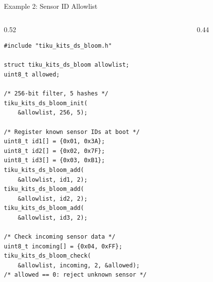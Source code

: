 \documentclass[aspectratio=169, 10pt]{beamer}
\begin{document}
\begin{frame}[fragile]{Example 2: Sensor ID Allowlist}
\begin{columns}[T]
\begin{column}{0.52\textwidth}
\begin{lstlisting}[style=cstyle,
  title={Fast membership check for allowed sensors}]
#include "tiku_kits_ds_bloom.h"

struct tiku_kits_ds_bloom allowlist;
uint8_t allowed;

/* 256-bit filter, 5 hashes */
tiku_kits_ds_bloom_init(
    &allowlist, 256, 5);

/* Register known sensor IDs at boot */
uint8_t id1[] = {0x01, 0x3A};
uint8_t id2[] = {0x02, 0x7F};
uint8_t id3[] = {0x03, 0xB1};
tiku_kits_ds_bloom_add(
    &allowlist, id1, 2);
tiku_kits_ds_bloom_add(
    &allowlist, id2, 2);
tiku_kits_ds_bloom_add(
    &allowlist, id3, 2);

/* Check incoming sensor data */
uint8_t incoming[] = {0x04, 0xFF};
tiku_kits_ds_bloom_check(
    &allowlist, incoming, 2, &allowed);
/* allowed == 0: reject unknown sensor */
\end{lstlisting}
\end{column}

\begin{column}{0.44\textwidth}
\begin{center}
\end{center}


\end{column}
\end{columns}
\end{frame}
\end{document}
